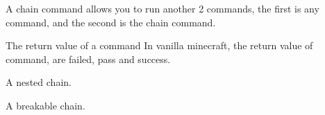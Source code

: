 
A chain command allows you to run another 2 commands, the first is any command, and the second is the chain command.

\begin{tips}{The return value of a command}
    In vanilla minecraft, the return value of command, are failed, pass and success.
\end{tips}



\begin{example}{A nested chain.}
\end{example}

\begin{example}{A breakable chain.}
\end{example}

